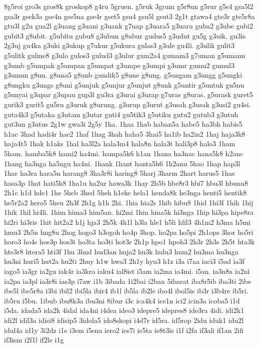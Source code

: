 {8g5roi gro3s gros8k groskop8 g4ru 5gruen. g5ruk 3grum g5r8un g5rur g5s4
gsa5l2 gsa3r gsek3a gse4n gse5na gse4r gset5 gsu4 gsu5l gsut3 2g1t gtawa4
gte3r gte5r8a gtu3l g2u gua2l g3uang g3uani g3uank g7uap g3uara5 g3uaru
guba2 g3ube gubi2 gubit3 g8ubit. g5ubitu gubu8 g3ubun g8ubur gudus5 g3udut
gu5g g3uik. gu3is 2g3uj gu4ka g3uki g3ukup g7ukur g5ukura gulas3 g3ule
gu4li. g3ulik gulit3 g5ulitk gulme8 g3ulo gulos3 gulud3 g3ulur gum2a4
gumam3 g7uman g5umanu g3umb g5umpak g5umpan g5umpat g3umpe g3umpi g3umr
gumu2 gumul3 g3umun g8un. g8una5 g8unb gundik5 g8une g8ung. g5ungam g3ungg
g5ungki g8ungku g3ungs g8uni g5unjuk g5unjur g5unjut g8unk g5untir g5untuk
gu5nu g5unyai g3upar g3upau gup3l gu3ra g3urai g3urap g7uras g8uras.
g5urask guret5 gurik3 gurit5 gu5ru g3uruk g8urung. g3urup g3urut g3usah
g3usak g3usi2 gu4si. guta4k3 g5utaka g3utam g3utar guti4 gu5tik3 g5utiku
gutu2 gutub3 g3utuh gut3un g3utus 2g1w gwa3i 2g5y 1ha. 1haa 1hab haban5a
habe5 ha3bh habis5 h1ac 3had hadi4r hae2 1haf 1hag 3hah haha5 3hai5 ha1ib
ha2in2 1haj haja3k8 haja4t5 1hak h1aks 1hal ha3l2a hala3m4 hala8n hala3t
hali3p8 halo3 1ham 5ham. hamba5k8 hami2 ha4mi. hampa5k6 h1an 1hana ha3nac
hana5k8 h2anc 1hang ha3nga ha5ngu ha4ni. 1hank 1hant hanta5h6 1h2anu 5hao
1hap hap3l 1har ha3ra hara5n harang8 3ha3r8i haring8 5harj 3harm 2hart
harus5 1has hasa3p 1hat hati5k8 1ha1u ha2ur hawa3k 1hay 2h5b hbe8r3 hbi7
hbu3l hbunu8 2h1c h1d hde1 1he 5heb 3hed 5heh h1eke hela1 henda8k he3nga
henti5 hentik8 he5r2a2 hero5 5heu 2h3f 2h1g h1h 2hi. 1hia hia2s 1hib hibu8
1hid 1hi3f 1hih 1hij 1hik 1hil hi4li. 1him hima3 him5an. hi2mi 1hin hina5k
hi3nga 1hip hi3pa hipe8ra hi2ri hi3ris 1hit hit2a2 h1j hja3 2h5k 4h1l h3la
hle1 h5li hlil3 4h1m2 h3ma h5mi hmu3 2h5n hng8u 2hog hogo3 h3ogoh ho4p
3hop. ho2pa ho5pi 2h1ops 3hor ho5ri horo3 ho4s hos3p hos3t ho3ta ho3ti
hot3r 2h1p hpo1 hpoh3 2h3r 2h3s 2h5t hta3k hte3r8 htera5 hti3f 1hu 3hud
hud3an huja2 hu3k hulu3 hum2 hu3ma hu3nga hu3ni huri5 hut2a hu2ti 2huy h1w
hwa3 2h1y hyu3 h1z i3a i7aa iaci3 i5ad ia3f iago5 ia3gr ia2gu iak4r ia3kro
iaku4 ial8ist i5am ia2ma ia4mi. i5an. ia3n8a ia2ni ia2pa ia3pl ia3r8i
ias3p i7aw i1b 3ibada 1i2bai i2ban 5ibarat iba8r5ib iba3ti 2ibe ibe5l
ibe5r8a i3bi ibil2 ibi5la ibir4 ib1l ib5la ib2le ibo4l ibol5is ib3r i3b4re
ib5ri. ib5ru i5bu. 1ibub ibu8k3a ibu3ni 8ibur i3c ica4k4 ice1n ici2 icin3a
icoba5 i1d i5da. idada5 ida2k 4idal ida4ni i4dea ideo3 idepre5 idepres8
ide3ra 4idi. idi2k1 idi2l idil3a idisi8 idisip5 3idola5 ido8skopi i4d7r
id5ra. id5rop 2idu iduk1 idu2l idul4a id1y 3i2dz i1e i3em i5ena iero2
ies7i ie5ta ie8t3is i1f i2fa if3ali if1an 2ifi if3ism i2f1l if2le i1g
}

